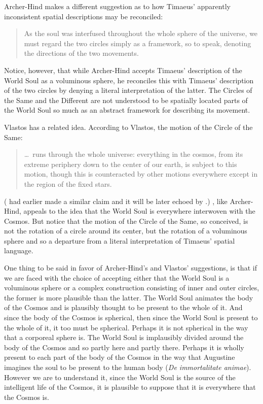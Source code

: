 Archer-Hind makes a different suggestion as to how Timaeus' apparently inconsistent spatial descriptions may be reconciled:
\begin{quote}
	As the soul was interfused throughout the whole sphere of the universe, we must regard the two circles simply as a framework, so to speak, denoting the directions of the two movements. \citep[112 n2]{Archer-Hind:1888qd}
\end{quote}
Notice, however, that while Archer-Hind accepts Timaeus' description of the World Soul as a voluminous sphere, he reconciles this with Timaeus' description of the two circles by denying a literal interpretation of the latter. The Circles of the Same and the Different are not understood to be spatially located parts of the World Soul so much as an abstract framework for describing its movement. 

Vlastos has a related idea. According to Vlastos, the motion of the Circle of the Same:
\begin{quote}
	\ldots\ runs through the whole universe: everything in the cosmos, from its extreme periphery down to the center of our earth, is subject to this motion, though this is counteracted by other motions everywhere except in the region of the fixed stars. \citep[32]{Vlastos:1975aa}
\end{quote}
(\citealt[76]{Cornford:1935fk} had earlier made a similar claim and it will be later echoed by \citealt[21--22 n26]{Zeyl:2000cs}.) \citet[32 n14]{Vlastos:1975aa}, like Archer-Hind, appeals to the idea that the World Soul is everywhere interwoven with the Cosmos. But notice that the motion of the Circle of the Same, so conceived, is not the rotation of a circle around its center, but the rotation of a voluminous sphere and so a departure from a literal interpretation of Timaeus' spatial language. 

One thing to be said in favor of Archer-Hind's and Vlastos' suggestions, is that if we are faced with the choice of accepting either that the World Soul is a voluminous sphere or a complex construction consisting of inner and outer circles, the former is more plausible than the latter. The World Soul animates the body of the Cosmos and is plausibly thought to be present to the whole of it. And since the body of the Cosmos is spherical, then since the World Soul is present to the whole of it, it too must be spherical. Perhaps it is not spherical in the way that a corporeal sphere is. The World Soul is implausibly divided around the body of the Cosmos and so partly here and partly there. Perhaps it is wholly present to each part of the body of the Cosmos in the way that Augustine imagines the soul to be present to the human body (\emph{De immortalitate animae}). However we are to understand it, since the World Soul is the source of the intelligent life of the Cosmos, it is plausible to suppose that it is everywhere that the Cosmos is.

